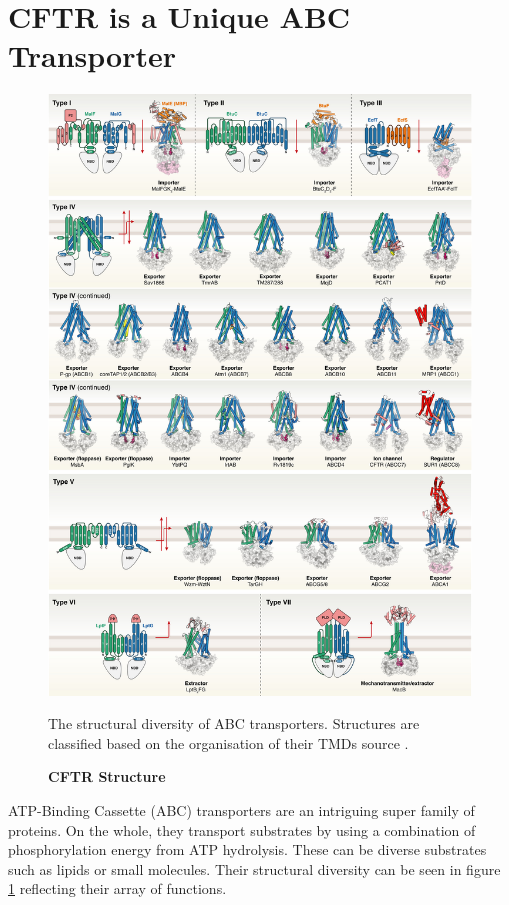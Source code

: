 \section{CFTR is a Unique ABC Transporter}

\begin{figure}
	\label{ABC_diversity}
	\begin{center}
	\includegraphics[width=\textwidth]{figures/ABC_classification.jpg}
	\end{center}
	\captionsetup{singlelinecheck = false, justification=raggedright}
	\caption[CFTR Structure] {\textbf{CFTR Structure}}{The structural diversity of ABC transporters. Structures are classified based on the organisation of their TMDs source \cite{thomas2020}.} 
\end{figure}
ATP-Binding Cassette (ABC) transporters are an intriguing super family of proteins. On the whole, they transport substrates by using a combination of phosphorylation energy from ATP hydrolysis. These can be diverse substrates such as lipids or small molecules. Their structural diversity can be seen in figure \ref{ABC_diversity} reflecting their array of functions. 

